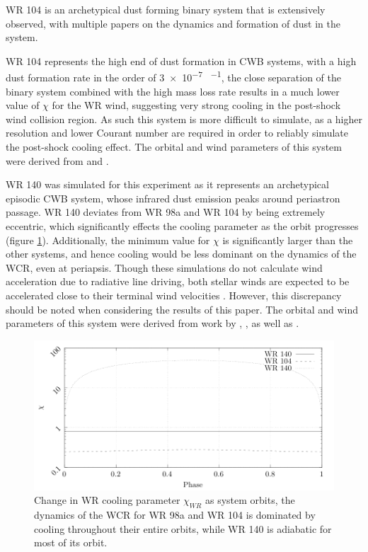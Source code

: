 
WR 104 is an archetypical dust forming binary system that is extensively observed, with multiple papers on the dynamics and formation of dust in the system. %

WR 104 represents the high end of dust formation in CWB systems, with a high dust formation rate in the order of \num{3e-7} \si{\solarmass\per\year}, the close separation of the binary system combined with the high mass loss rate results in a much lower value of $\chi$ for the WR wind, suggesting very strong cooling in the post-shock wind collision region. As such this system is more difficult to simulate, as a higher resolution and lower Courant number are required in order to reliably simulate the post-shock cooling effect.
The orbital and wind parameters of this system were derived from \cite{soulain_sphere_2018} and \cite{harries_three-dimensional_2004}. 




WR 140 was simulated for this experiment as it represents an archetypical episodic CWB system, whose infrared dust emission peaks around periastron passage. WR 140 deviates from WR 98a and WR 104 by being extremely eccentric, which significantly effects the cooling parameter as the orbit progresses (figure \ref{fig:chiphase}). Additionally, the minimum value for $\chi$ is significantly larger than the other systems, and hence cooling would be less dominant on the dynamics of the WCR, even at periapsis. Though these simulations do not calculate wind acceleration due to radiative line driving, both stellar winds are expected to be accelerated close to their terminal wind velocities \parencite{lamersIntroductionStellarWinds1999}. However, this discrepancy should be noted when considering the results of this paper. %
The orbital and wind parameters of this system were derived from work by \cite{monnier_first_2011}, \cite{usov_stellar_1991}, as well as \cite{thomasOrbitStellarMasses2021}.

\begin{figure}[h]
  \centering
  \includegraphics[width=\linewidth]{assets/chi-vs-phase.pdf}
  \caption[$\chi_{WR}$ change over system orbit]{Change in WR cooling parameter $\chi_{WR}$ as system orbits, the dynamics of the WCR for WR 98a and WR 104 is dominated by cooling throughout their entire orbits, while WR 140 is adiabatic for most of its orbit.}
  \label{fig:chiphase}
\end{figure}


